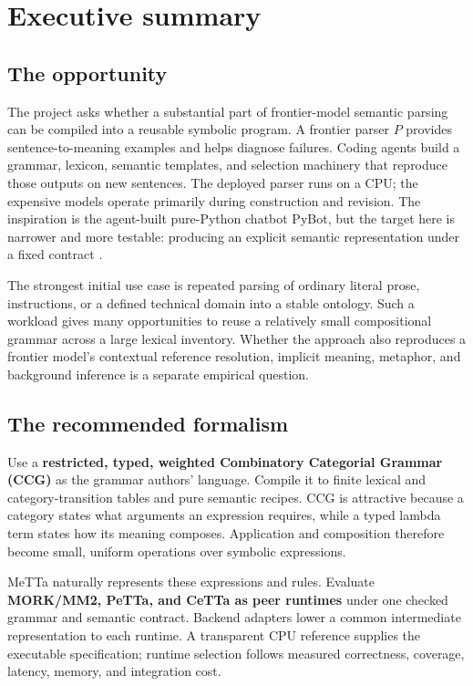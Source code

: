 \documentclass[11pt,a4paper]{article}
\begin{document}
\section*{Executive summary}
{}

\subsection*{The opportunity}
The project asks whether a substantial part of frontier-model semantic parsing
can be compiled into a reusable symbolic program. A frontier parser \(P\)
provides sentence-to-meaning examples and helps diagnose failures. Coding
agents build a grammar, lexicon, semantic templates, and selection machinery
that reproduce those outputs on new sentences. The deployed parser runs on a
CPU; the expensive models operate primarily during construction and revision.
The inspiration is the agent-built pure-Python chatbot PyBot, but the target
here is narrower and more testable: producing an explicit semantic
representation under a fixed contract \cite{pybot}.

The strongest initial use case is repeated parsing of ordinary literal prose,
instructions, or a defined technical domain into a stable ontology. Such a
workload gives many opportunities to reuse a relatively small compositional
grammar across a large lexical inventory. Whether the approach also reproduces
a frontier model's contextual reference resolution, implicit meaning, metaphor,
and background inference is a separate empirical question.

\subsection*{The recommended formalism}
Use a \textbf{restricted, typed, weighted Combinatory Categorial Grammar
(CCG)} as the grammar authors' language. Compile it to finite lexical and
category-transition tables and pure semantic recipes. CCG is attractive
because a category states what arguments an expression requires, while a typed
lambda term states how its meaning composes. Application and composition
therefore become small, uniform operations over symbolic expressions.

MeTTa naturally represents these expressions and rules. Evaluate
\textbf{\mbox{MORK/MM2}, PeTTa, and CeTTa as peer runtimes} under one
checked grammar and semantic contract. Backend adapters lower a
common intermediate representation to each runtime. A transparent CPU
reference supplies the executable specification; runtime selection follows
measured correctness, coverage, latency, memory, and integration cost.
\end{document}
